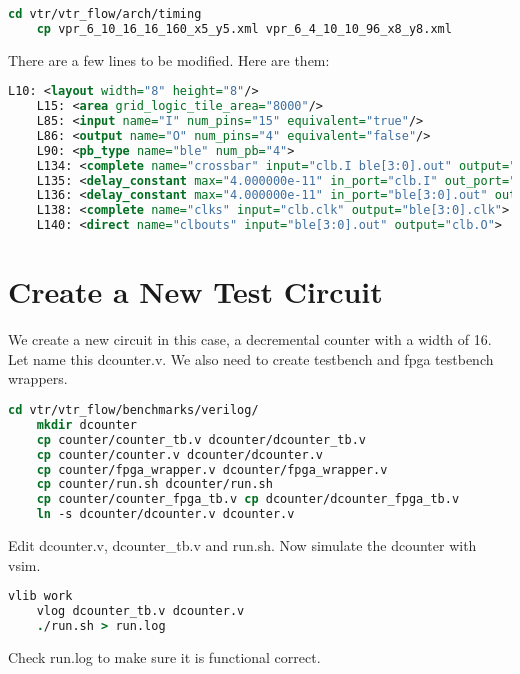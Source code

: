 \documentclass[10pt]{article}
\begin{document}
\begin{lstlisting}[language=csh]
    cd vtr/vtr_flow/arch/timing
    cp vpr_6_10_16_16_160_x5_y5.xml vpr_6_4_10_10_96_x8_y8.xml
\end{lstlisting}

\noindent
There are a few lines to be modified. Here are them:

\begin{lstlisting}[language=xml]
    L10: <layout width="8" height="8"/>
    L15: <area grid_logic_tile_area="8000"/>
    L85: <input name="I" num_pins="15" equivalent="true"/>
    L86: <output name="O" num_pins="4" equivalent="false"/>
    L90: <pb_type name="ble" num_pb="4">
    L134: <complete name="crossbar" input="clb.I ble[3:0].out" output="ble[3:0].in">
    L135: <delay_constant max="4.000000e-11" in_port="clb.I" out_port="ble[3:0].in" />
    L136: <delay_constant max="4.000000e-11" in_port="ble[3:0].out" out_port="ble[3:0].in" />
    L138: <complete name="clks" input="clb.clk" output="ble[3:0].clk">
    L140: <direct name="clbouts" input="ble[3:0].out" output="clb.O">
\end{lstlisting}

\section{Create a New Test Circuit}

We create a new circuit in this case, a decremental counter with a width of 16. Let name this dcounter.v.
We also need to create testbench and fpga testbench wrappers.

\begin{lstlisting}[language=csh]
    cd vtr/vtr_flow/benchmarks/verilog/
    mkdir dcounter
    cp counter/counter_tb.v dcounter/dcounter_tb.v
    cp counter/counter.v dcounter/dcounter.v
    cp counter/fpga_wrapper.v dcounter/fpga_wrapper.v
    cp counter/run.sh dcounter/run.sh
    cp counter/counter_fpga_tb.v cp dcounter/dcounter_fpga_tb.v
    ln -s dcounter/dcounter.v dcounter.v
\end{lstlisting}

\noindent
Edit dcounter.v, dcounter\_tb.v and run.sh. Now simulate the dcounter with vsim.

\begin{lstlisting}[language=csh]
    vlib work
    vlog dcounter_tb.v dcounter.v
    ./run.sh > run.log
\end{lstlisting}

\noindent
Check run.log to make sure it is functional correct.
\end{document}

